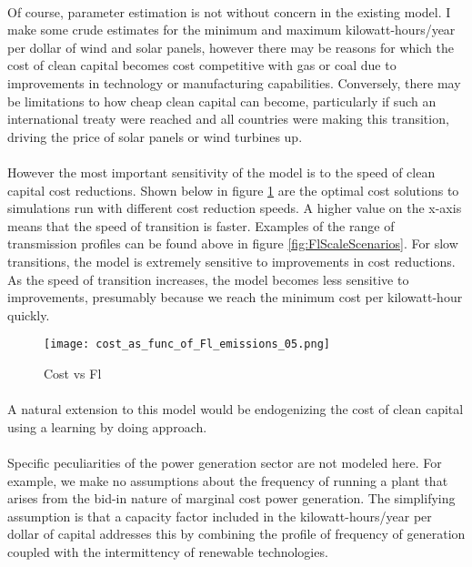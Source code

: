\documentclass{easychithesis}
\begin{document}
\paragraph{} Of course, parameter estimation is not without concern in the existing model. I make some crude estimates for the minimum and maximum kilowatt-hours/year per dollar of wind and solar panels, however there may be reasons for which the cost of clean capital becomes cost competitive with gas or coal due to improvements in technology or manufacturing capabilities. Conversely, there may be limitations to how cheap clean capital can become, particularly if such an international treaty were reached and all countries were making this transition, driving the price of solar panels or wind turbines up. 

\paragraph{} However the most important sensitivity of the model is to the speed of clean capital cost reductions. Shown below in figure \ref{fig:costVsFl} are the optimal cost solutions to simulations run with different cost reduction speeds. A higher value on the x-axis means that the speed of transition is faster. Examples of the range of transmission profiles can be found above in figure \ref{fig:FlScaleScenarios}. For slow transitions, the model is extremely sensitive to improvements in cost reductions. As the speed of transition increases, the model becomes less sensitive to improvements, presumably because we reach the minimum cost per kilowatt-hour quickly. 

\begin{figure}[h]
\texttt{[image: cost\_as\_func\_of\_Fl\_emissions\_05.png]}
\caption{Cost vs Fl\label{fig:costVsFl}}
\end{figure}

\paragraph{} A natural extension to this model would be endogenizing the cost of clean capital using a learning by doing approach. 


\paragraph{} Specific peculiarities of the power generation sector are not modeled here. For example, we make no assumptions about the frequency of running a plant that arises from the bid-in nature of marginal cost power generation. The simplifying assumption is that a capacity factor included in the kilowatt-hours/year per dollar of capital addresses this by combining the profile of frequency of generation coupled with the intermittency of renewable technologies. 
\end{document}
